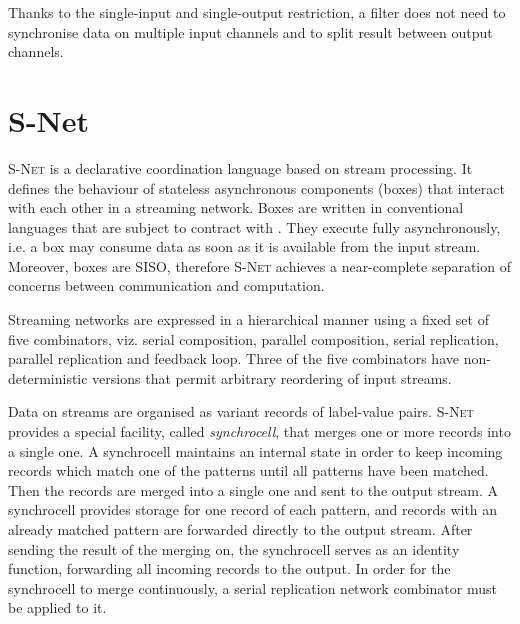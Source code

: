 Thanks to the single-input and single-output restriction, a filter does not need to synchronise data on multiple input channels and to split result between output channels.


    \section{S-Net}
\textsc{S-Net} \cite{snet_intro} is a declarative coordination language based on stream processing. It defines the behaviour of stateless asynchronous components (boxes) that interact with each other in a streaming network. Boxes are written in conventional languages that are subject to contract with . They execute fully asynchronously, i.e. a box may consume data as soon as it is available from the input stream. Moreover, boxes are SISO, therefore \textsc{S-Net} achieves a near-complete separation of concerns between communication and computation.

Streaming networks are expressed in a hierarchical manner using a fixed set of five combinators, viz. serial composition, parallel composition, serial replication, parallel replication and feedback loop. Three of the five combinators have non-deterministic versions that permit arbitrary reordering of input streams.

Data on streams are organised as variant records of label-value pairs. \textsc{S-Net} provides a special facility, called \emph{synchrocell}, that merges one or more records into a single one. A synchrocell maintains an internal state in order to keep incoming records which match one of the patterns until all patterns have been matched. Then the records are merged into a single one and sent to the output stream. A synchrocell provides storage for one record of each pattern, and records with an already matched pattern are forwarded directly to the output stream. After sending the result of the merging on, the synchrocell serves as an identity function, forwarding all incoming records to the output. In order for the synchrocell to merge continuously, a serial replication network combinator must be applied to it.


